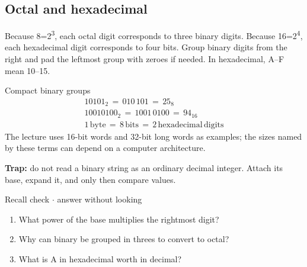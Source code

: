 \documentclass[11pt]{article}
\begin{document}
\begin{keepsection}
\begin{keepsection}
\subsection{Octal and hexadecimal}

Because 8=2\textsuperscript{3}, each octal digit corresponds to three binary digits. Because 16=2\textsuperscript{4}, each hexadecimal digit corresponds to four bits. Group binary digits from the right and pad the leftmost group with zeroes if needed. In hexadecimal, A–F mean 10–15.

\begin{equationcard}{Compact binary groups}
\[ \begin{gathered} 10101_{2}\, =\, 010\, 101\, =\, 25_{8} \\ 10010100_{2}\, =\, 1001\, 0100\, =\, 94_{16} \\ 1\, \text{byte}\, =\, 8\, \text{bits}\, =\, 2\, \text{hexadecimal}\, \text{digits} \end{gathered} \]
{\small The lecture uses 16-bit words and 32-bit long words as examples; the sizes named by these terms can depend on a computer architecture.}
\end{equationcard}

\begin{notebox}\textbf{Trap:} do not read a binary string as an ordinary decimal integer. Attach its base, expand it, and only then compare values.\end{notebox}

\begin{recallbox}{Recall check \ensuremath{\cdot} answer without looking}
\begin{enumerate}
\item What power of the base multiplies the rightmost digit?
\item Why can binary be grouped in threes to convert to octal?
\item What is A in hexadecimal worth in decimal?
\end{enumerate}

\end{recallbox}
\end{keepsection}
\end{keepsection}
\end{document}
